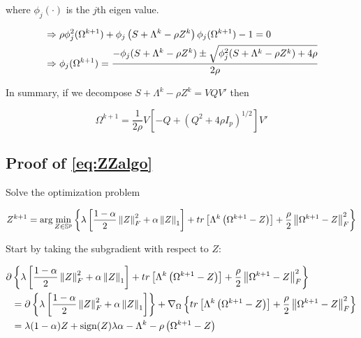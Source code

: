 \documentclass[11pt,]{report}
\theoremstyle{definition}
\theoremstyle{definition}
\theoremstyle{definition}
\theoremstyle{remark}
\begin{document}
where \(\phi_{j}(\cdot)\) is the \(j\)th eigen value.

\begin{equation}
\begin{split}
  &\Rightarrow \rho\phi_{j}^{2}(\Omega^{k + 1}) + \phi_{j}\left( S + \Lambda^{k} - \rho Z^{k} \right)\phi_{j}(\Omega^{k + 1}) - 1 = 0 \\
  &\Rightarrow \phi_{j}(\Omega^{k + 1}) = \frac{-\phi_{j}(S + \Lambda^{k} - \rho Z^{k}) \pm \sqrt{\phi_{j}^{2}(S + \Lambda^{k} - \rho Z^{k}) + 4\rho}}{2\rho}
\end{split}
\notag
\end{equation}

In summary, if we decompose \(S + \Lambda^{k} - \rho Z^{k} = VQV'\) then

\begin{equation}
\Omega^{k + 1} = \frac{1}{2\rho}V\left[ -Q + (Q^{2} + 4\rho I_{p})^{1/2}\right] V'
\label{eq:appendixomegaproof}
\end{equation}

\hypertarget{proofZZalgo}{%
\subsection{Proof of \eqref{eq:ZZalgo}}\label{proofZZalgo}}

Solve the optimization problem

\begin{equation}
Z^{k + 1} = \arg\min_{Z \in \mathbb{S}^{p}}\left\{ \lambda\left[ \frac{1 - \alpha}{2}\left\| Z \right\|_{F}^{2} + \alpha\left\| Z \right\|_{1} \right] + tr\left[\Lambda^{k}\left(\Omega^{k + 1} - Z\right)\right] + \frac{\rho}{2}\left\| \Omega^{k + 1} - Z \right\|_{F}^{2} \right\}
\label{eq:appendixZZloglik}\notag
\end{equation}

Start by taking the subgradient with respect to \(Z\):

\begin{equation}
\begin{split}
  \partial&\left\{ \lambda\left[ \frac{1 - \alpha}{2}\left\| Z \right\|_{F}^{2} + \alpha\left\| Z \right\|_{1} \right] + tr\left[\Lambda^{k}\left(\Omega^{k + 1} - Z\right)\right] + \frac{\rho}{2}\left\| \Omega^{k + 1} - Z \right\|_{F}^{2} \right\} \\
  &= \partial\left\{ \lambda\left[ \frac{1 - \alpha}{2}\left\| Z \right\|_{F}^{2} + \alpha\left\| Z \right\|_{1} \right] \right\} + \nabla_{\Omega}\left\{ tr\left[\Lambda^{k}\left(\Omega^{k + 1} - Z\right)\right] + \frac{\rho}{2}\left\| \Omega^{k + 1} - Z \right\|_{F}^{2} \right\} \\
  &= \lambda(1 - \alpha)Z + \mbox{sign}(Z)\lambda\alpha - \Lambda^{k} - \rho\left( \Omega^{k + 1} - Z \right)
\end{split}
\label{eq:appendixZZgradient}\notag
\end{equation}
\end{document}

